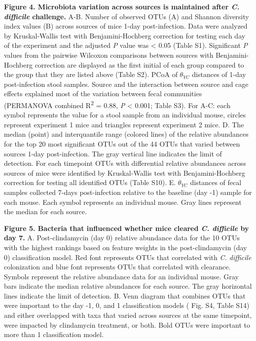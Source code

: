\documentclass[
  11pt,
]{article}
\begin{document}
\textbf{Figure 4. Microbiota variation across sources is maintained
after \emph{C. difficile} challenge.} A-B. Number of observed OTUs (A)
and Shannon diversity index values (B) across sources of mice 1-day
post-infection. Data were analyzed by Kruskal-Wallis test with
Benjamini-Hochberg correction for testing each day of the experiment and
the adjusted \emph{P} value was \textless{} 0.05 (Table S1). Significant
\emph{P} values from the pairwise Wilcoxon comparisons between sources
with Benjamini-Hochberg correction are displayed as the first initial of
each group compared to the group that they are listed above (Table S2).
PCoA of \(\theta_{YC}\) distances of 1-day post-infection stool samples.
Source and the interaction between source and cage effects explained
most of the variation between fecal communities (PERMANOVA combined
R\textsuperscript{2} = 0.88, \emph{P} \textless{} 0.001; Table S3). For
A-C: each symbol represents the value for a stool sample from an
individual mouse, circles represent experiment 1 mice and triangles
represent experiment 2 mice. D. The median (point) and interquantile
range (colored lines) of the relative abundances for the top 20 most
significant OTUs out of the 44 OTUs that varied between sources 1-day
post-infection. The gray vertical line indicates the limit of detection.
For each timepoint OTUs with differential relative abundances across
sources of mice were identified by Kruskal-Wallis test with
Benjamini-Hochberg correction for testing all identified OTUs (Table
S10). E. \(\theta_{YC}\) distances of fecal samples collected 7-days
post-infection relative to the baseline (day -1) sample for each mouse.
Each symbol represents an individual mouse. Gray lines represent the
median for each source.

\newpage

\textbf{Figure 5. Bacteria that influenced whether mice cleared \emph{C.
difficile} by day 7.} A. Post-clindamycin (day 0) relative abundance
data for the 10 OTUs with the highest rankings based on feature weights
in the post-clindamycin (day 0) classification model. Red font
represents OTUs that correlated with \emph{C. difficile} colonization
and blue font represents OTUs that correlated with clearance. Symbols
represent the relative abundance data for an individual mouse. Gray bars
indicate the median relative abundances for each source. The gray
horizontal lines indicate the limit of detection. B. Venn diagram that
combines OTUs that were important to the day -1, 0, and 1 classification
models ( Fig. S4, Table S14) and either overlapped with taxa that varied
across sources at the same timepoint, were impacted by clindamycin
treatment, or both. Bold OTUs were important to more than 1
classification model.
\end{document}
